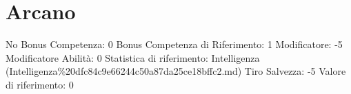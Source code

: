 \section{Arcano}\label{arcano}

\begin{description}
\tightlist
\item[Tags: ABI]
No Bonus Competenza: 0 Bonus Competenza di Riferimento: 1 Modificatore:
-5 Modificatore Abilità: 0 Statistica di riferimento: Intelligenza
(Intelligenza\%20dfc84c9e66244c50a87da25ce18bffc2.md) Tiro Salvezza: -5
Valore di riferimento: 0
\end{description}
